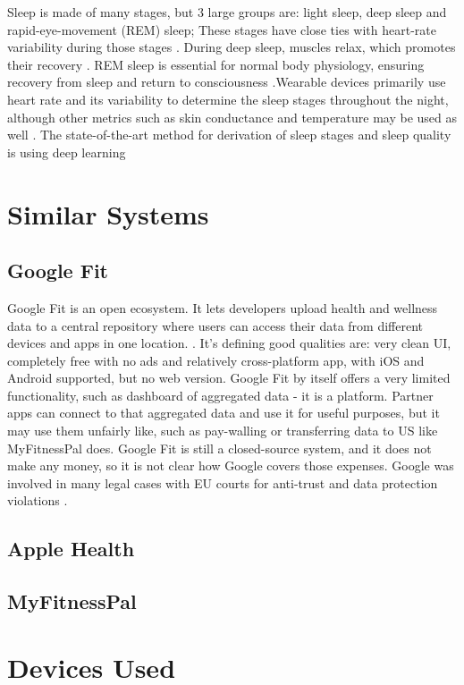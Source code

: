 Sleep is made of many stages, but 3 large groups are: light sleep, deep sleep and rapid-eye-movement (REM) sleep; These stages have close ties with heart-rate variability during those stages \cite{sleepDef}. During deep sleep, muscles relax, which promotes their recovery \cite{Jung2010Energy}. REM sleep is essential for normal body physiology, ensuring recovery from sleep and return to consciousness \cite{VERTES1986371}.Wearable devices primarily use heart rate and its variability to determine the sleep stages throughout the night, although other metrics such as skin conductance and temperature may be used as well \cite{Zambotti2019Wearable}. The state-of-the-art method for derivation of sleep stages and sleep quality is using deep learning \cite{Sathyanarayana2016Sleep}

\section{Similar Systems}
\label{section:similarSystems}
\subsection{Google Fit}
Google Fit is an open ecosystem. It lets developers upload health and wellness data to a central repository where users can access their data from different devices and apps in one location. \cite{googleFit}. It's defining good qualities are: very clean UI, completely free with no ads and relatively cross-platform app, with iOS and Android supported, but no web version.  Google Fit by itself offers a very limited functionality, such as dashboard of aggregated data - it is a platform. Partner apps can connect to that aggregated data and use it for useful purposes, but it may use them unfairly like, such as pay-walling or transferring data to US like MyFitnessPal does. Google Fit is still a closed-source system, and it does not make any money, so it is not clear how Google covers those expenses. Google was involved in many legal cases with EU courts for anti-trust \cite{googleAntiTrust} and data protection violations \cite{googleDataProtect, googleDataProtect2} .
\subsection{Apple Health}
\subsection{MyFitnessPal}
\section{Devices Used}
